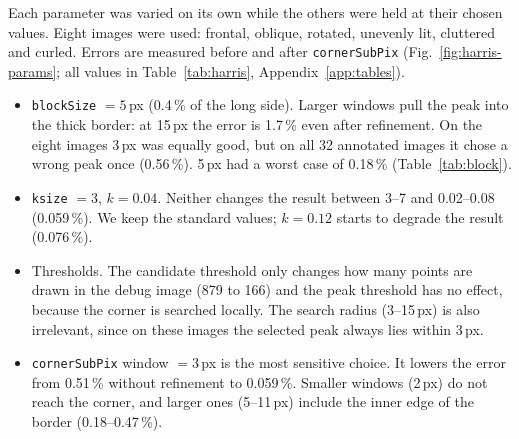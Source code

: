 \documentclass[conference]{IEEEtran}
\begin{document}
Each parameter was varied on its own while the others were held at their chosen values. Eight images were used: frontal, oblique, rotated, unevenly lit, cluttered and curled. Errors are measured before and after \texttt{cornerSubPix} (Fig.~\ref{fig:harris-params}; all values in Table~\ref{tab:harris}, Appendix~\ref{app:tables}).
\begin{itemize}
\item \texttt{blockSize} $=5$\,px (0.4\,\% of the long side). Larger windows pull the peak into the thick border: at 15\,px the error is 1.7\,\% even after refinement. On the eight images 3\,px was equally good, but on all 32 annotated images it chose a wrong peak once (0.56\,\%). 5\,px had a worst case of 0.18\,\% (Table~\ref{tab:block}).
\item \texttt{ksize} $=3$, $k=0.04$. Neither changes the result between 3--7 and 0.02--0.08 (0.059\,\%). We keep the standard values; $k=0.12$ starts to degrade the result (0.076\,\%).
\item Thresholds. The candidate threshold only changes how many points are drawn in the debug image (879 to 166) and the peak threshold has no effect, because the corner is searched locally. The search radius (3--15\,px) is also irrelevant, since on these images the selected peak always lies within 3\,px.
\item \texttt{cornerSubPix} window $=3$\,px is the most sensitive choice. It lowers the error from 0.51\,\% without refinement to 0.059\,\%. Smaller windows (2\,px) do not reach the corner, and larger ones (5--11\,px) include the inner edge of the border (0.18--0.47\,\%).
\end{itemize}
\end{document}
